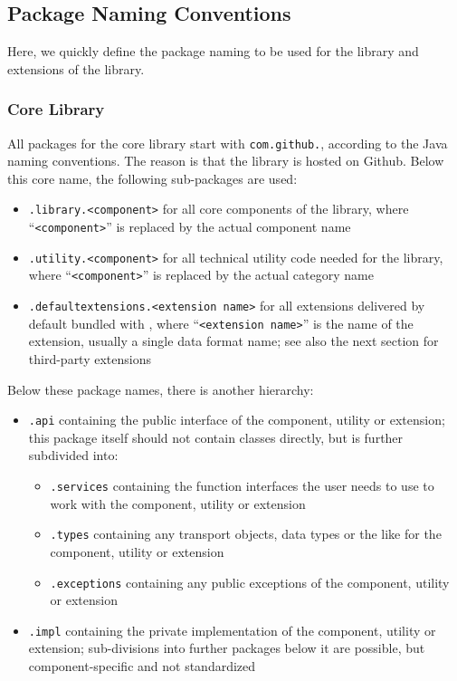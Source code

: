 \subsection{Package Naming Conventions}%
\label{sec:PackageNamingConventions}%

Here, we quickly define the package naming to be used for the library and extensions of the library.

\subsubsection{Core Library}%
\label{sec:CoreLibrary}%

All packages for the core library start with \texttt{com.github.\LibNamePackage{}}, according to the Java naming conventions. The reason is that the library is hosted on Github. Below this core name, the following sub-packages are used:
\begin{itemize}
\item \texttt{.library.<component>} for all core components of the library, where ``\texttt{<component>}'' is replaced by the actual component name
\item \texttt{.utility.<component>} for all technical utility code needed for the library, where ``\texttt{<component>}'' is replaced by the actual category name
\item \texttt{.defaultextensions.<extension name>} for all extensions delivered by default bundled with \LibName{}, where ``\texttt{<extension name>}'' is the name of the extension, usually a single data format name; see also the next section for third-party extensions
\end{itemize}

Below these package names, there is another hierarchy:
\begin{itemize}
\item \texttt{.api} containing the public interface of the component, utility or extension; this package itself should not contain classes directly, but is further subdivided into:
\begin{itemize}
\item \texttt{.services} containing the function interfaces the user needs to use to work with the component, utility or extension
\item \texttt{.types} containing any transport objects, data types or the like for the component, utility or extension
\item \texttt{.exceptions} containing any public exceptions of the component, utility or extension
\end{itemize}
\item \texttt{.impl} containing the private implementation of the component, utility or extension; sub-divisions into further packages below it  are possible, but component-specific and not standardized
\end{itemize}

